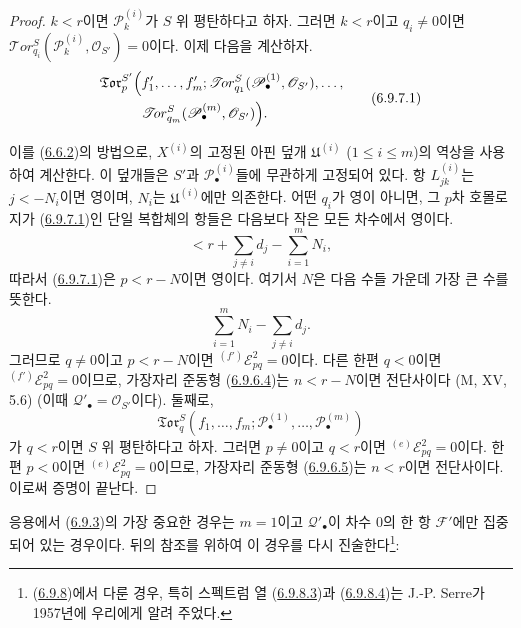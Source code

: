 \begin{proof}
$k<r$이면 $\mathscr P_k^{(i)}$가 $S$ 위 평탄하다고 하자. 그러면
$k<r$이고 $q_i\ne0$이면
$\mathscr{T}\!or_{q_i}^S(\mathscr P_k^{(i)},\mathscr O_{S'})=0$이다.
이제 다음을 계산하자.
\[
\begin{split}
  \mathfrak{Tor}_p^{S'}\Bigl(
  &f'_1,\ldots,f'_m;
  \mathscr{T}\!or_{q_1}^S(\mathscr P_\bullet^{(1)},\mathscr O_{S'}),
  \ldots,\\
  &\mathscr{T}\!or_{q_m}^S(\mathscr P_\bullet^{(m)},\mathscr O_{S'})
  \Bigr).
\end{split}
\tag{6.9.7.1}\label{III.6.9.7.1.fr}
\]

이를 (\hyperref[III.6.6.2-fr]{6.6.2})의 방법으로, $X^{(i)}$의 고정된
아핀 덮개 $\mathfrak U^{(i)}$ ($1\leq i\leq m$)의 역상을 사용하여
계산한다. 이 덮개들은 $S'$과 $\mathscr P_\bullet^{(i)}$들에 무관하게
고정되어 있다. 항 $L_{jk}^{(i)}$는 $j<-N_i$이면 영이며, $N_i$는
$\mathfrak U^{(i)}$에만 의존한다. 어떤 $q_i$가 영이 아니면, 그
$p$차 호몰로지가 (\hyperref[III.6.9.7.1.fr]{6.9.7.1})인 단일 복합체의
항들은 다음보다 작은 모든 차수에서 영이다.
\[
  <r+\sum_{j\ne i}d_j-\sum_{i=1}^m N_i,
\]
따라서 (\hyperref[III.6.9.7.1.fr]{6.9.7.1})은 $p<r-N$이면 영이다.
여기서 $N$은 다음 수들 가운데 가장 큰 수를 뜻한다.
\[
  \sum_{i=1}^m N_i-\sum_{j\ne i}d_j.
\]
그러므로 $q\ne0$이고 $p<r-N$이면
${}^{(f')}\mathscr E_{pq}^2=0$이다. 다른 한편 $q<0$이면
${}^{(f')}\mathscr E_{pq}^2=0$이므로, 가장자리 준동형
(\hyperref[III.6.9.6.4.fr]{6.9.6.4})는 $n<r-N$이면 전단사이다
(M, XV, 5.6) (이때 $\mathscr Q'_\bullet=\mathscr O_{S'}$이다).
둘째로,
\[
  \mathfrak{Tor}_q^S
  (f_1,\ldots,f_m;
   \mathscr P_\bullet^{(1)},\ldots,\mathscr P_\bullet^{(m)})
\]
가 $q<r$이면 $S$ 위 평탄하다고 하자. 그러면 $p\ne0$이고 $q<r$이면
${}^{(e)}\mathscr E_{pq}^2=0$이다. 한편 $p<0$이면
${}^{(e)}\mathscr E_{pq}^2=0$이므로, 가장자리 준동형
(\hyperref[III.6.9.6.5.fr]{6.9.6.5})는 $n<r$이면 전단사이다. 이로써
증명이 끝난다.
\end{proof}


응용에서 (\hyperref[III.6.9.3-fr]{6.9.3})의 가장 중요한 경우는
$m=1$이고 $\mathscr Q'_\bullet$이 차수 $0$의 한 항 $\mathscr F'$에만
집중되어 있는 경우이다. 뒤의 참조를 위하여 이 경우를 다시
진술한다\footnote{(\hyperref[III.6.9.8-fr]{6.9.8})에서 다룬 경우,
특히 스펙트럼 열 (\hyperref[III.6.9.8.3.fr]{6.9.8.3})과
(\hyperref[III.6.9.8.4.fr]{6.9.8.4})는 J.-P. Serre가 1957년에 우리에게
알려 주었다.}:

